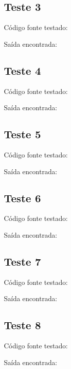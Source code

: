 \documentclass[11pt]{article}
\begin{document}
	\subsection{Teste 3}
	
		Código fonte testado:
		
			
		Saída encontrada:
		


	\subsection{Teste 4}
	
		Código fonte testado:
		
			
		Saída encontrada:
		
		
	
	\subsection{Teste 5}
	
		Código fonte testado:
		
			
		Saída encontrada:
		


	\subsection{Teste 6}
	
		Código fonte testado:
		
			
		Saída encontrada:
		


	\subsection{Teste 7}
	
		Código fonte testado:
		
			
		Saída encontrada:
		


	\subsection{Teste 8}
	
		Código fonte testado:
		
		
		Saída encontrada:
		
\end{document}
